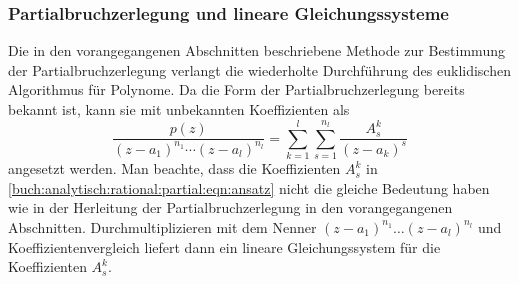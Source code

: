 \subsubsection{Partialbruchzerlegung und lineare Gleichungssysteme}
Die in den vorangegangenen Abschnitten beschriebene Methode zur
Bestimmung der Partialbruchzerlegung verlangt die wiederholte
Durchführung des euklidischen Algorithmus für Polynome.
Da die Form der Partialbruchzerlegung bereits bekannt ist,
kann sie mit unbekannten Koeffizienten als
\begin{equation}
\frac{p(z)}{(z-a_1)^{n_1}\cdots(z-a_l)^{n_l}}
=
\sum_{k=1}^l
\sum_{s=1}^{n_l}
\frac{A^k_s}{(z-a_k)^s}
\label{buch:analytisch:rational:partial:eqn:ansatz}
\end{equation}
angesetzt werden.
Man beachte, dass die Koeffizienten $A^k_s$ in
\eqref{buch:analytisch:rational:partial:eqn:ansatz} nicht
die gleiche Bedeutung haben wie in der Herleitung der
Partialbruchzerlegung in den vorangegangenen Abschnitten.
Durchmultiplizieren mit dem Nenner $(z-a_1)^{n_1}\dots (z-a_l)^{n_l}$
und Koeffizientenvergleich liefert dann ein lineare Gleichungssystem
für die Koeffizienten $A^k_s$.
%

